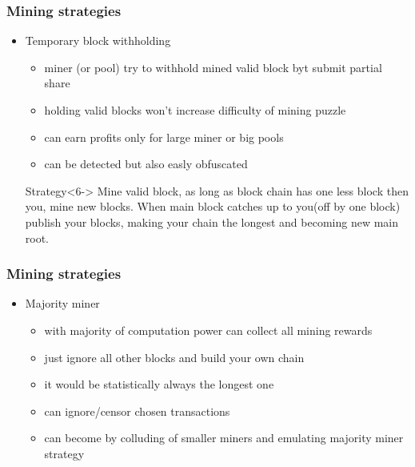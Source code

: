 \documentclass{beamer}
\begin{document}
\begin{frame}
    \frametitle{Mining strategies}
    \begin{itemize}
        \item<1-> Temporary block withholding 
        \begin{itemize}
            \item<2-> miner (or pool) try to withhold mined valid block byt submit partial share
            \item<3-> holding valid blocks won't increase difficulty of mining puzzle
            \item<4-> can earn profits only for large miner or big pools
            \item<5-> can be detected but also easly obfuscated
        \end{itemize}
        \vspace{10pt}
        \begin{block}{Strategy}<6->
            Mine valid block, as long as block chain has one less block then you, mine new blocks.
            When main block catches up to you(off by one block) publish your blocks, making your chain the longest
            and becoming new main root.
        \end{block}     
    \end{itemize} 
\end{frame}

\begin{frame}
    \frametitle{Mining strategies}
    \begin{itemize}
        \item<1-> Majority miner 
        \begin{itemize}
            \item<2-> with majority of computation power can collect all mining rewards
            \item<3-> just ignore all other blocks and build your own chain
            \item<4-> it would be statistically always the longest one
            \item<5-> can ignore/censor chosen transactions 
            \item<6-> can become by colluding of smaller miners and emulating majority miner strategy
        \end{itemize}   
    \end{itemize} 
\end{frame}
\end{document}
